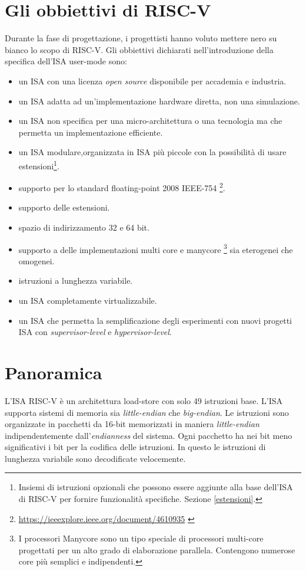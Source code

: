 \documentclass[12pt, a4paper]{report}
\begin{document}
\section{Gli obbiettivi di RISC-V}
Durante la fase di progettazione, i progettisti hanno voluto mettere nero su bianco lo scopo di RISC-V. Gli obbiettivi dichiarati nell'introduzione della specifica dell'ISA user-mode sono:
\begin{itemize}
	\item un ISA con una licenza \textit{open source} disponibile per accademia e industria.
	\item un ISA adatta ad un'implementazione hardware diretta, non una simulazione.
	\item un ISA non specifica per una micro-architettura o una tecnologia ma che permetta un implementazione efficiente.
	\item un ISA modulare,organizzata in ISA più piccole con la possibilità di usare estensioni\footnote{Insiemi di istruzioni opzionali che possono essere aggiunte alla base dell'ISA di RISC-V per fornire funzionalità specifiche. Sezione \ref{estensioni}.}.
	\item supporto per lo standard floating-point 2008 IEEE-754 \footnote{ \url{https://ieeexplore.ieee.org/document/4610935} \cite{IEEE754-2008}}.
	\item supporto delle estensioni. 
	\item spazio di indirizzamento 32 e 64 bit.
	\item supporto a delle implementazioni multi core e manycore \footnote{I processori Manycore sono un tipo speciale di processori multi-core progettati per un alto grado di elaborazione parallela. Contengono numerose core più semplici e indipendenti. } sia eterogenei che omogenei.
	\item istruzioni a lunghezza variabile.
	\item un ISA completamente virtualizzabile.
	\item un ISA che permetta la semplificazione degli esperimenti con nuovi progetti ISA con \textit{supervisor-level} e \textit{hypervisor-level}. 
	
\end{itemize}

\section{Panoramica}
L'ISA RISC-V è un architettura load-store con solo 49 istruzioni base. L'ISA supporta sistemi di memoria sia \textit{little-endian} che \textit{big-endian}. Le istruzioni sono organizzate in pacchetti da 16-bit memorizzati in maniera \textit{little-endian} indipendentemente dall'\textit{endianness} del sistema. Ogni pacchetto ha nei bit meno significativi i bit per la codifica delle istruzioni. In questo le istruzioni di lunghezza variabile sono decodificate velocemente.
\end{document}
